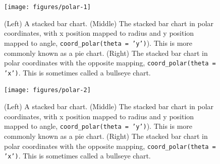 \begin{Shaded}
\begin{Highlighting}[]
\StringTok{ }\NormalTok{(} \NormalTok{(}\NormalTok{), } 
\StringTok{  }\NormalTok{(} \NormalTok{))}
\end{Highlighting}
\end{Shaded}

\begin{figure}
\texttt{[image: figures/polar-1]} \caption{(Left) A stacked bar chart.  (Middle) The stacked bar chart in polar coordinates, with x position mapped to radius and y position mapped to angle, \texttt{coord\_polar(theta = 'y')}).  This is more commonly known as a pie chart.  (Right) The stacked bar chart in polar coordinates with the opposite mapping, \texttt{coord\_polar(theta = 'x')}. This is sometimes called a bullseye chart.\label{fig:polar1}}
\end{figure}

\begin{Shaded}
\begin{Highlighting}[]
\StringTok{ }\NormalTok{(} \NormalTok{)}
\end{Highlighting}
\end{Shaded}

\begin{figure}
\texttt{[image: figures/polar-2]} \caption{(Left) A stacked bar chart.  (Middle) The stacked bar chart in polar coordinates, with x position mapped to radius and y position mapped to angle, \texttt{coord\_polar(theta = 'y')}).  This is more commonly known as a pie chart.  (Right) The stacked bar chart in polar coordinates with the opposite mapping, \texttt{coord\_polar(theta = 'x')}. This is sometimes called a bullseye chart.\label{fig:polar2}}
\end{figure}

\begin{Shaded}
\begin{Highlighting}[]

\StringTok{ }\NormalTok{()}
\end{Highlighting}
\end{Shaded}

